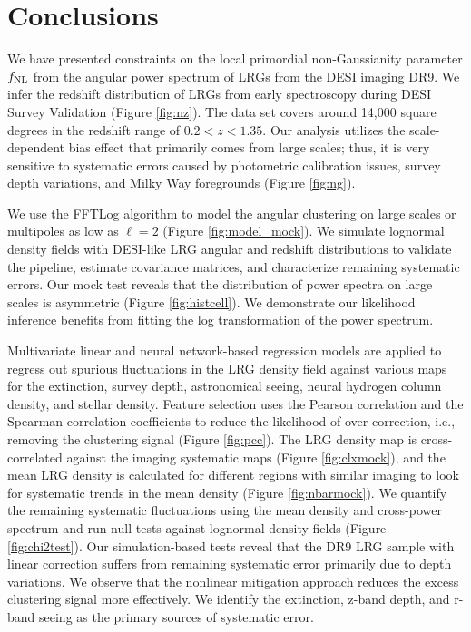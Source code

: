 \section{Conclusions}\label{sec:conclusion}
We have presented constraints on the local primordial non-Gaussianity parameter $f_{\rm NL}$ from the angular power spectrum of LRGs from the DESI imaging DR9. We infer the redshift distribution of LRGs from early spectroscopy during DESI Survey Validation (Figure \ref{fig:nz}). The data set covers around 14,000 square degrees in the redshift range of $0.2< z < 1.35$. Our analysis utilizes the scale-dependent bias effect that primarily comes from large scales; thus, it is very sensitive to systematic errors caused by photometric calibration issues, survey depth variations, and Milky Way foregrounds (Figure \ref{fig:ng}). 

We use the FFTLog algorithm to model the angular clustering on large scales or multipoles as low as $\ell=2$ (Figure \ref{fig:model_mock}). We simulate lognormal density fields with DESI-like LRG angular and redshift distributions to validate the pipeline, estimate covariance matrices, and characterize remaining systematic errors. Our mock test reveals that the distribution of power spectra on large scales is asymmetric (Figure \ref{fig:histcell}). We demonstrate our likelihood inference benefits from fitting the log transformation of the power spectrum. 

Multivariate linear and neural network-based regression models are applied to regress out spurious fluctuations in the LRG density field against various maps for the extinction, survey depth, astronomical seeing, neural hydrogen column density, and stellar density. Feature selection uses the Pearson correlation and the Spearman correlation coefficients to reduce the likelihood of over-correction, i.e., removing the clustering signal (Figure \ref{fig:pcc}). The LRG density map is cross-correlated against the imaging systematic maps (Figure \ref{fig:clxmock}), and the mean LRG density is calculated for different regions with similar imaging to look for systematic trends in the mean density (Figure \ref{fig:nbarmock}). We quantify the remaining systematic fluctuations using the mean density and cross-power spectrum and run null tests against lognormal density fields (Figure \ref{fig:chi2test}). Our simulation-based tests reveal that the DR9 LRG sample with linear correction suffers from remaining systematic error primarily due to depth variations. We observe that the nonlinear mitigation approach reduces the excess clustering signal more effectively. We identify the extinction, z-band depth, and r-band seeing as the primary sources of systematic error. 

